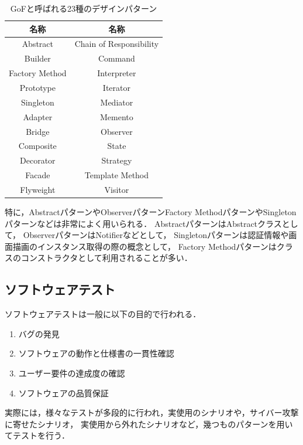 \documentclass[platex,dvipdfmx,12pt]{jsarticle}
\begin{document}
\begin{table}[H]
  \centering
  \caption{GoFと呼ばれる23種のデザインパターン}
  \label{tab:gof-design-pattern}
  \begin{tabular}{cc}
    名称 & 名称 \\
    \hline
    Abstract         & Chain of Responsibility \\
    Builder          & Command                 \\
    Factory Method   & Interpreter             \\
    Prototype        & Iterator                \\
    Singleton        & Mediator                \\
    Adapter          & Memento                 \\
    Bridge           & Observer                \\
    Composite        & State                   \\
    Decorator        & Strategy                \\
    Facade           & Template Method         \\
    Flyweight        & Visitor                 \\
  \end{tabular}
\end{table}

特に，AbstractパターンやObserverパターンFactory MethodパターンやSingletonパターンなどは非常によく用いられる．
AbstractパターンはAbstractクラスとして，
ObserverパターンはNotifierなどとして，
Singletonパターンは認証情報や画面描画のインスタンス取得の際の概念として，
Factory Methodパターンはクラスのコンストラクタとして利用されることが多い．


\subsection{ソフトウェアテスト}
ソフトウェアテストは一般に以下の目的で行われる．

\begin{enumerate}
  \item バグの発見
  \item ソフトウェアの動作と仕様書の一貫性確認
  \item ユーザー要件の達成度の確認
  \item ソフトウェアの品質保証
\end{enumerate}

実際には，様々なテストが多段的に行われ，実使用のシナリオや，サイバー攻撃に寄せたシナリオ，
実使用から外れたシナリオなど，幾つものパターンを用いてテストを行う．
\end{document}

